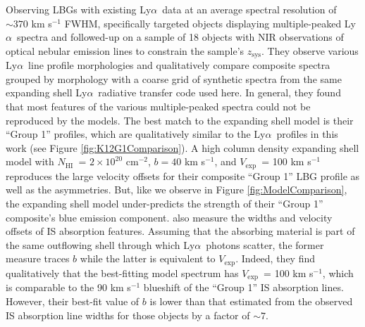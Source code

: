 \documentclass{emulateapj}
\newcommand{\lya}{Ly$\alpha$}
\def\nh{$N_{\mathrm{HI}}$}
\def\vexp{$V_{\mathrm{exp}}$}
\begin{document}
Observing LBGs with existing \lya\ data at an average spectral resolution of $\sim370$ km s$^{-1}$ FWHM, \citet{kulas2012} specifically targeted objects displaying multiple-peaked \lya\ spectra and followed-up on a sample of 18 objects with NIR observations of optical nebular emission lines to constrain the sample's $z_{\mathrm{sys}}$. They observe various \lya\ line profile morphologies and qualitatively compare composite spectra grouped by morphology with a coarse grid of synthetic spectra from the same expanding shell \lya\ radiative transfer code used here. In general, they found that most features of the various multiple-peaked spectra could not be reproduced by the models. The best match to the expanding shell model is their ``Group 1'' profiles, which are qualitatively similar to the \lya\ profiles in this work (see Figure \ref{fig:K12G1Comparison}). A high column density expanding shell model with \nh\ = $2\times10^{20}$ cm$^{-2}$, $b = 40$ km s$^{-1}$, and \vexp\ = 100 km s$^{-1}$ reproduces the large velocity offsets for their composite ``Group 1'' LBG profile as well as the asymmetries. But, like we observe in Figure \ref{fig:ModelComparison}, the expanding shell model under-predicts the strength of their ``Group 1'' composite's blue emission component. \citet{kulas2012} also measure the widths and velocity offsets of IS absorption features. Assuming that the absorbing material is part of the same outflowing shell through which \lya\ photons scatter, the former measure traces $b$ while the latter is equivalent to \vexp. Indeed, they find qualitatively that the best-fitting model spectrum has \vexp\ = 100 km s$^{-1}$, which is comparable to the 90 km s$^{-1}$ blueshift of the ``Group 1'' IS absorption lines. However, their best-fit value of $b$ is lower than that estimated from the observed IS absorption line widths for those objects by a factor of $\sim7$.  
\end{document}
